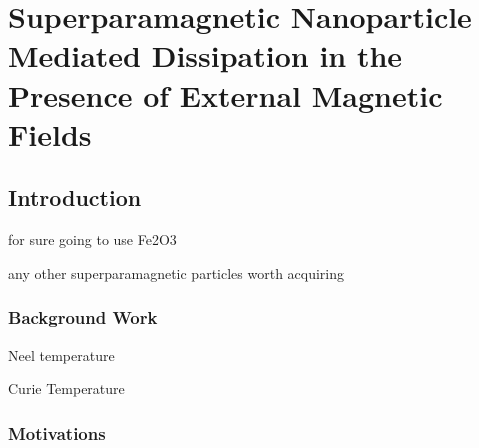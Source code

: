 \chapter{Superparamagnetic Nanoparticle Mediated Dissipation in the Presence of External Magnetic Fields}
\label{chap-seven}

\section{Introduction}

for sure going to use Fe2O3

any other superparamagnetic particles worth acquiring



\subsection{Background Work}

Neel temperature

Curie Temperature

\subsection{Motivations}




